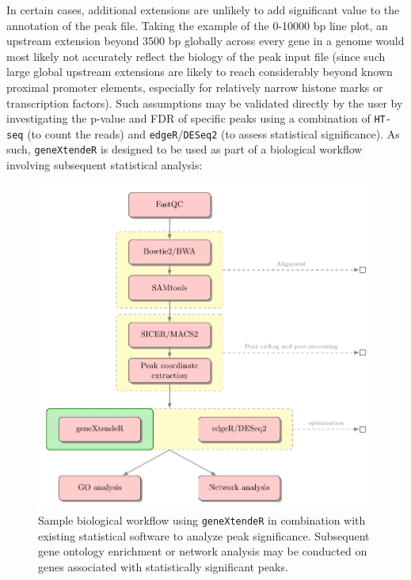 \documentclass[12pt]{article}
\begin{document}
{In certain cases, additional extensions are unlikely to add significant value to the annotation of the peak file.  Taking the example of the 0-10000 bp line plot, an upstream extension beyond 3500 bp globally across every gene in a genome would most likely not accurately reflect the biology of the peak input file (since such large global upstream extensions are likely to reach considerably beyond known proximal promoter elements, especially for relatively narrow histone marks or transcription factors).  Such assumptions may be validated directly by the user by investigating the p-value and FDR of specific peaks using a combination of \texttt{HT-seq} (to count the reads) and \texttt{edgeR}/\texttt{DESeq2} (to assess statistical significance).  As such, \texttt{geneXtendeR} is designed to be used as part of a biological workflow involving subsequent statistical analysis:

\begin{figure}[H]
\centering
\includegraphics{figures/workflow.pdf}
\caption{Sample biological workflow using \texttt{geneXtendeR} in combination with existing statistical software to analyze peak significance.  Subsequent gene ontology enrichment or network analysis may be conducted on genes associated with statistically significant peaks.}
\end{figure}

}
\end{document}
